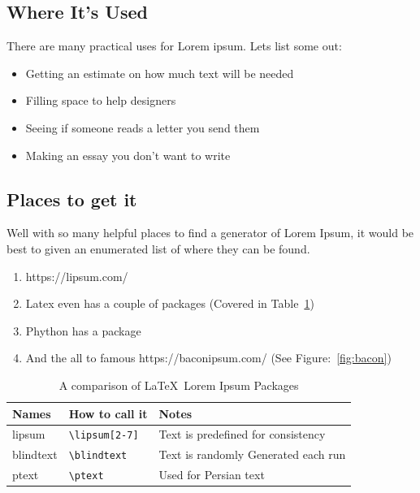 \documentclass[11pt]{article}
\begin{document}
\subsection{Where It's Used}
There are many practical uses for Lorem ipsum.
Lets list some out:
\begin{itemize}
\item Getting an estimate on how much text will be needed
\item Filling space to help designers
\item Seeing if someone reads a letter you send them
\item Making an essay you don't want to write
\end{itemize}

\subsection{Places to get it}
Well with so many helpful places to find a generator of Lorem Ipsum, it would be best to given an enumerated list of where they can be found.
\begin{enumerate}
\item https://lipsum.com/
\item Latex even has a couple of packages (Covered in Table~\ref{tbl:dastable})
\item Phython has a package
\item And the all to famous https://baconipsum.com/ (See Figure:~\ref{fig:bacon})
\end{enumerate}
\begin{table}[h]
\centering
\caption{A comparison of \LaTeX\ Lorem Ipsum Packages}
\label{tbl:dastable}
\begin{tabular}{|l|ll|}
\hline
Names & How to call it & Notes \\ \hline
lipsum & \verb=\lipsum[2-7]= & Text is predefined for consistency \\
blindtext & \verb=\blindtext= & Text is randomly Generated each run \\
ptext & \verb=\ptext= & Used for Persian text \\ \hline
\end{tabular}
\end{table}
\end{document}
